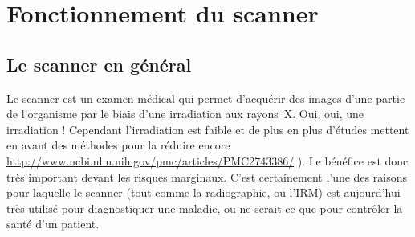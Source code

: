 \documentclass[main.tex]{subfiles}
\begin{document}
%

\section{Fonctionnement du scanner \label{sec:fct_scan}}
\subsection{Le scanner en général}
Le scanner est un examen médical qui permet d'acquérir des images d'une partie de l'organisme par le biais d'une irradiation aux rayons~X. Oui, oui, une irradiation ! Cependant l'irradiation est faible et de plus en plus d'études mettent en avant des méthodes pour la réduire encore  \url{http://www.ncbi.nlm.nih.gov/pmc/articles/PMC2743386/} ). Le bénéfice est donc très important devant les risques marginaux. C'est certainement l'une des raisons pour laquelle le scanner (tout comme la radiographie, ou l'IRM) est aujourd'hui très utilisé pour diagnostiquer une maladie, ou ne serait-ce  que pour contrôler la santé d'un patient.
\end{document}
